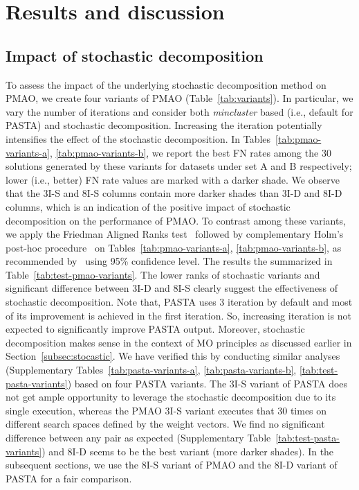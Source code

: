\section{Results and discussion}
\label{sec:experiment}

\subsection{Impact of stochastic decomposition}
To assess the impact of the underlying stochastic decomposition method on PMAO, we create four variants of PMAO (Table~\ref{tab:variants}). In particular, we vary the number of iterations and consider both \textit{mincluster} based (i.e., default for PASTA) and stochastic decomposition. Increasing the iteration potentially intensifies the effect of the stochastic decomposition. In Tables~\ref{tab:pmao-variants-a},  \ref{tab:pmao-variants-b}, we report the best FN rates among the 30 solutions generated by these variants for datasets under set A and B respectively; lower (i.e., better) FN rate values are marked with a darker shade.
We observe that the 3I-S and 8I-S columns contain more darker shades than 3I-D and 8I-D columns, which is an indication of the positive impact of stochastic decomposition on the performance of PMAO. To contrast among these variants, we apply the Friedman Aligned Ranks test~\cite{hodges2012rank} followed by complementary Holm’s post-hoc procedure~\cite{holm1979simple} on Tables~\ref{tab:pmao-variants-a},  \ref{tab:pmao-variants-b}, as recommended by~\cite{derrac2011practical} using 95\% confidence level. The results the summarized in Table~\ref{tab:test-pmao-variants}. The lower ranks of stochastic variants and significant difference between 3I-D and 8I-S clearly suggest the effectiveness of stochastic decomposition. Note that, PASTA uses 3 iteration by default and most of its improvement is achieved in the first iteration. So, increasing iteration is not expected to significantly improve PASTA output. Moreover, stochastic decomposition makes sense in the context of MO principles as discussed earlier in Section~\ref{subsec:stocastic}. We have verified this by conducting similar analyses (Supplementary Tables~\ref{tab:pasta-variants-a}, \ref{tab:pasta-variants-b},  \ref{tab:test-pasta-variants}) based on four PASTA variants. The 3I-S variant of PASTA does not get ample opportunity to leverage the stochastic decomposition due to its single execution, whereas the PMAO 3I-S variant executes that 30 times on different search spaces defined by the weight vectors. We find no significant difference between any pair as expected (Supplementary Table~\ref{tab:test-pasta-variants}) and 8I-D seems to be the best variant (more darker shades). In the subsequent sections, we use the 8I-S variant of PMAO and the 8I-D variant of PASTA for a fair comparison. 

